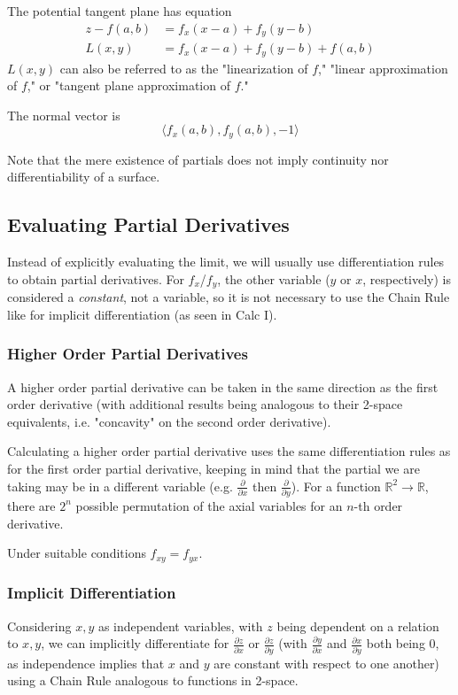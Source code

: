 \documentclass{article}
\begin{document}
The potential tangent plane has equation
\begin{align*}
	z - f(a,b) &= f_x(x - a) + f_y(y - b)\\
	L(x,y) &= f_x(x-a) + f_y(y-b) + f(a,b)
\end{align*}
$L(x,y)$ can also be referred to as the "linearization of $f$," "linear approximation of $f$," or "tangent plane approximation of $f$."

The normal vector is
$$\langle f_x(a,b), f_y(a,b), -1 \rangle$$

Note that the mere existence of partials does not imply continuity nor differentiability of a surface.

\subsection{Evaluating Partial Derivatives}
Instead of explicitly evaluating the limit, we will usually use differentiation rules to obtain partial derivatives. For $f_x$/$f_y$, the other variable ($y$ or $x$, respectively) is considered a \emph{constant}, not a variable, so it is not necessary to use the Chain Rule like for implicit differentiation (as seen in Calc I).

\subsubsection{Higher Order Partial Derivatives}
A higher order partial derivative can be taken in the same direction as the first order derivative (with additional results being analogous to their 2-space equivalents, i.e. "concavity" on the second order derivative).

Calculating a higher order partial derivative uses the same differentiation rules as for the first order partial derivative, keeping in mind that the partial we are taking may be in a different variable (e.g. $\frac{\partial}{\partial x}$ then $\frac{\partial}{\partial y}$). For a function $\mathbb{R}^2\to\mathbb{R}$, there are $2^n$ possible permutation of the axial variables for an $n$-th order derivative.

Under suitable conditions $f_{xy} = f_{yx}$.

\subsubsection{Implicit Differentiation}
Considering $x,y$ as independent variables, with $z$ being dependent on a relation to $x,y$, we can implicitly differentiate for $\frac{\partial z}{\partial x}$ or $\frac{\partial z}{\partial y}$ (with $\frac{\partial y}{\partial x}$ and $\frac{\partial x}{\partial y}$ both being $0$, as independence implies that $x$ and $y$ are constant with respect to one another) using a Chain Rule analogous to functions in 2-space.
\end{document}
